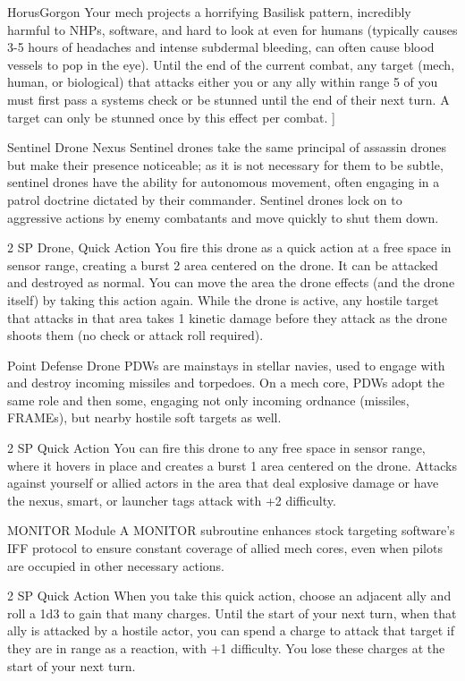\begin{mech}{Horus}{Gorgon}
{Your mech projects a horrifying Basilisk pattern, incredibly harmful to NHPs, software, and hard to look at even for humans (typically causes 3-5 hours of headaches and intense subdermal bleeding, can often cause blood vessels to pop in the eye). Until the end of the current combat, any target (mech, human, or biological) that attacks either you or any ally within range 5 of you must first pass a systems check or be stunned until the end of their next turn. A target can only be stunned once by this effect per combat.
}]


Sentinel Drone Nexus
Sentinel drones take the same principal of assassin drones but make their presence noticeable; as it is not necessary for them to be subtle, sentinel drones have the ability for autonomous movement, often engaging in a patrol doctrine dictated by their commander. Sentinel drones lock on to aggressive actions by enemy combatants and move quickly to shut them down.

2 SP
Drone, Quick Action
You fire this drone as a quick action at a free space in sensor range, creating a burst 2 area centered on the drone. It can be attacked and destroyed as normal. You can move the area the drone effects (and the drone itself) by taking this action again. While the drone is active, any hostile target that attacks in that area takes 1 kinetic damage before they attack as the drone shoots them (no check or attack roll required).

Point Defense Drone
PDWs are mainstays in stellar navies, used to engage with and destroy incoming missiles and torpedoes. On a mech core, PDWs adopt the same role and then some, engaging not only incoming ordnance (missiles, FRAMEs), but nearby hostile soft targets as well. 

2 SP
Quick Action
You can fire this drone to any free space in sensor range, where it hovers in place and creates a burst 1 area centered on the drone. Attacks against yourself or allied actors in the area that deal explosive damage or have the nexus, smart, or launcher tags attack with +2 difficulty.

MONITOR Module
A MONITOR subroutine enhances stock targeting software’s IFF protocol to ensure constant coverage of allied mech cores, even when pilots are occupied in other necessary actions. 

2 SP
Quick Action
When you take this quick action, choose an adjacent ally and roll a 1d3 to gain that many charges. Until the start of your next turn, when that ally is attacked by a hostile actor, you can spend a charge to attack that target if they are in range as a reaction, with +1 difficulty. You lose these charges at the start of your next turn.


\end{mech}
